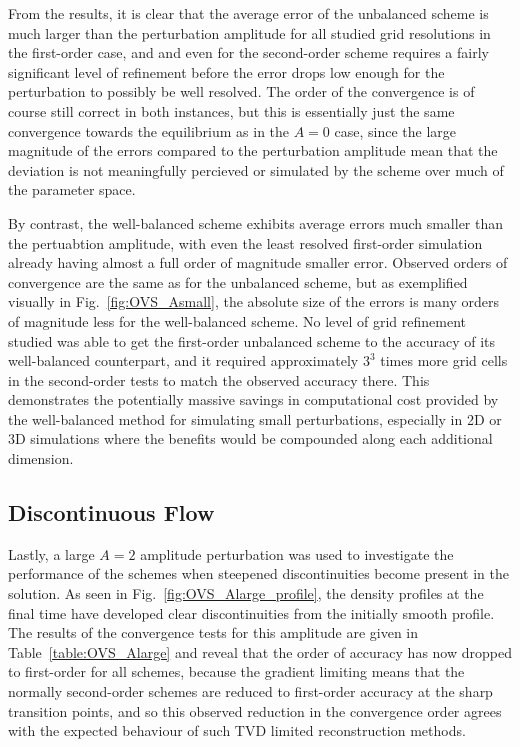 From the results, it is clear that the average error of the unbalanced scheme is much larger than the perturbation amplitude for all studied grid resolutions in the first-order case, and and even for the second-order scheme requires a fairly significant level of refinement before the error drops low enough for the perturbation to possibly be well resolved. The order of the convergence is of course still correct in both instances, but this is essentially just the same convergence towards the equilibrium as in the $A=0$ case, since the large magnitude of the errors compared to the perturbation amplitude mean that the deviation is not meaningfully percieved or simulated by the scheme over much of the parameter space.

By contrast, the well-balanced scheme exhibits average errors much smaller than the pertuabtion amplitude, with even the least resolved first-order simulation already having almost a full order of magnitude smaller error. Observed orders of convergence are the same as for the unbalanced scheme, but as exemplified visually in Fig.~\ref{fig:OVS_Asmall}, the absolute size of the errors is many orders of magnitude less for the well-balanced scheme. No level of grid refinement studied was able to get the first-order unbalanced scheme to the accuracy of its well-balanced counterpart, and it required approximately $3^3$ times more grid cells in the second-order tests to match the observed accuracy there. This demonstrates the potentially massive savings in computational cost provided by the well-balanced method for simulating small perturbations, especially in 2D or 3D simulations where the benefits would be compounded along each additional dimension.

\subsection{Discontinuous Flow}

Lastly, a large $A=2$ amplitude perturbation was used to investigate the performance of the schemes when steepened discontinuities become present in the solution. As seen in Fig.~\ref{fig:OVS_Alarge_profile}, the density profiles at the final time have developed clear discontinuities from the initially smooth profile. The results of the convergence tests for this amplitude are given in Table~\ref{table:OVS_Alarge} and reveal that the order of accuracy has now dropped to first-order for all schemes, because the gradient limiting means that the normally second-order schemes are reduced to first-order accuracy at the sharp transition points, and so this observed reduction in the convergence order agrees with the expected behaviour of such TVD limited reconstruction methods.

